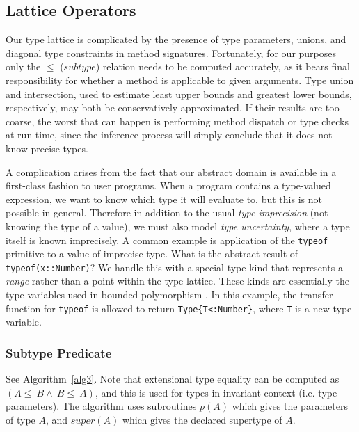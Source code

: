 \documentclass[9pt]{sigplanconf}
\begin{document}
\subsection{Lattice Operators}

Our type lattice is complicated by the presence of type parameters, unions,
and diagonal type constraints in method signatures. Fortunately, for our
purposes only the $\leq$ ($subtype$) relation needs to be computed accurately,
as it bears final responsibility for whether a method is applicable to
given arguments. Type union and intersection, used to estimate
least upper bounds and greatest lower bounds, respectively, may both be
conservatively approximated. If their results are too coarse, the
worst that can happen is performing method dispatch or type checks
at run time, since the inference process will simply conclude that it does
not know precise types.

A complication arises from the fact that our abstract domain is
available in a first-class fashion to user programs. When a program
contains a type-valued expression, we want to know which type it will
evaluate to, but this is not possible in general. Therefore in addition
to the usual \emph{type imprecision} (not knowing the type of a value),
we must also model \emph{type uncertainty}, where a type itself is
known imprecisely. A common example is application of the {\tt typeof}
primitive to a value of imprecise type. What is the abstract result of
{\tt typeof(x::Number)}? We handle this with a special type kind that
represents a \emph{range} rather than a point within the type lattice.
These kinds are essentially the type variables used in bounded
polymorphism \cite{boundedquant}. In this example, the
transfer function for {\tt typeof} is allowed to return
{\tt Type\{T<:Number\}}, where {\tt T} is a new type variable.


\subsubsection{Subtype Predicate}

See Algorithm~\ref{alg3}. Note that extensional type equality can be
computed as $(A\leq~B\land~B\leq~A)$, and this is used for types in
invariant context (i.e. type parameters). The algorithm uses subroutines
$p(A)$ which gives the parameters of type $A$, and $super(A)$ which gives
the declared supertype of $A$.
\end{document}
